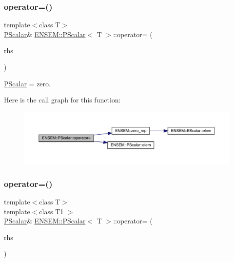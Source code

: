 \subsubsection{\texorpdfstring{operator=()}{operator=()}\hspace{0.1cm}{\footnotesize\ttfamily [2/4]}}
{\footnotesize\ttfamily template$<$class T$>$ \\
\mbox{\hyperlink{classENSEM_1_1PScalar}{P\+Scalar}}\& \mbox{\hyperlink{classENSEM_1_1PScalar}{E\+N\+S\+E\+M\+::\+P\+Scalar}}$<$ T $>$\+::operator= (\begin{DoxyParamCaption}\item[{const \mbox{\hyperlink{structENSEM_1_1Zero}{Zero}} \&}]{rhs }\end{DoxyParamCaption})\hspace{0.3cm}{\ttfamily [inline]}}



\mbox{\hyperlink{classENSEM_1_1PScalar}{P\+Scalar}} = zero. 

Here is the call graph for this function\+:
\nopagebreak
\begin{figure}[H]
\begin{center}
\leavevmode
\includegraphics[width=350pt]{d3/d27/classENSEM_1_1PScalar_a4357d579e24371f6384da9008f4512b3_cgraph}
\end{center}
\end{figure}
\mbox{\label{classENSEM_1_1PScalar_ae69d6f1ad8ec0b65652f8d16c5f97b11}} 
\subsubsection{\texorpdfstring{operator=()}{operator=()}\hspace{0.1cm}{\footnotesize\ttfamily [3/4]}}
{\footnotesize\ttfamily template$<$class T$>$ \\
template$<$class T1 $>$ \\
\mbox{\hyperlink{classENSEM_1_1PScalar}{P\+Scalar}}\& \mbox{\hyperlink{classENSEM_1_1PScalar}{E\+N\+S\+E\+M\+::\+P\+Scalar}}$<$ T $>$\+::operator= (\begin{DoxyParamCaption}\item[{const \mbox{\hyperlink{classENSEM_1_1PScalar}{P\+Scalar}}$<$ T1 $>$ \&}]{rhs }\end{DoxyParamCaption})\hspace{0.3cm}{\ttfamily [inline]}}



